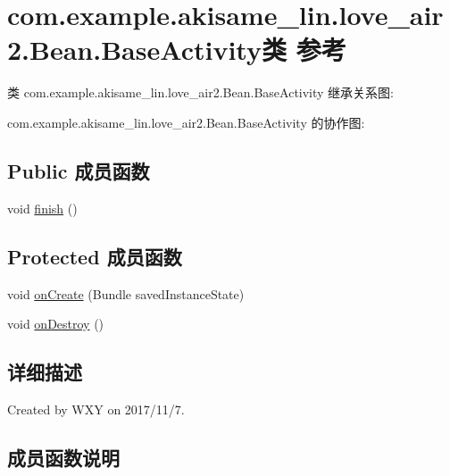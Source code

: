 \hypertarget{classcom_1_1example_1_1akisame__lin_1_1love__air2_1_1_bean_1_1_base_activity}{}\section{com.\+example.\+akisame\+\_\+lin.\+love\+\_\+air2.\+Bean.\+Base\+Activity类 参考}
\label{classcom_1_1example_1_1akisame__lin_1_1love__air2_1_1_bean_1_1_base_activity}


类 com.\+example.\+akisame\+\_\+lin.\+love\+\_\+air2.\+Bean.\+Base\+Activity 继承关系图\+:


com.\+example.\+akisame\+\_\+lin.\+love\+\_\+air2.\+Bean.\+Base\+Activity 的协作图\+:
\subsection*{Public 成员函数}
\begin{DoxyCompactItemize}
\item 
void \mbox{\hyperlink{classcom_1_1example_1_1akisame__lin_1_1love__air2_1_1_bean_1_1_base_activity_af2babebed91cd631ba5c2460522ddaa6}{finish}} ()
\end{DoxyCompactItemize}
\subsection*{Protected 成员函数}
\begin{DoxyCompactItemize}
\item 
void \mbox{\hyperlink{classcom_1_1example_1_1akisame__lin_1_1love__air2_1_1_bean_1_1_base_activity_a4060e53da2d56a08c23ac6f58fae0e96}{on\+Create}} (Bundle saved\+Instance\+State)
\item 
void \mbox{\hyperlink{classcom_1_1example_1_1akisame__lin_1_1love__air2_1_1_bean_1_1_base_activity_a460be5e41e40168a98933c918e2b9d5f}{on\+Destroy}} ()
\end{DoxyCompactItemize}


\subsection{详细描述}
Created by W\+XY on 2017/11/7. 

\subsection{成员函数说明}
\mbox{\label{classcom_1_1example_1_1akisame__lin_1_1love__air2_1_1_bean_1_1_base_activity_af2babebed91cd631ba5c2460522ddaa6}} 
